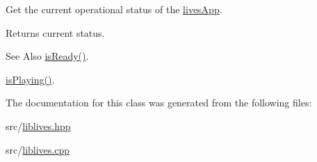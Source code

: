Get the current operational status of the \hyperlink{classlives_1_1livesApp}{lives\-App}. 

\begin{DoxyReturn}{Returns}
current status. 
\end{DoxyReturn}
\begin{DoxySeeAlso}{See Also}
\hyperlink{classlives_1_1livesApp_a4fcefcf7c5dc1e745a12c5a0c07fe220}{is\-Ready()}. 

\hyperlink{classlives_1_1livesApp_acc0efc13838f8a1e7af93851d27e8b90}{is\-Playing()}. 
\end{DoxySeeAlso}


The documentation for this class was generated from the following files\-:\begin{DoxyCompactItemize}
\item 
src/\hyperlink{liblives_8hpp}{liblives.\-hpp}\item 
src/\hyperlink{liblives_8cpp}{liblives.\-cpp}\end{DoxyCompactItemize}
